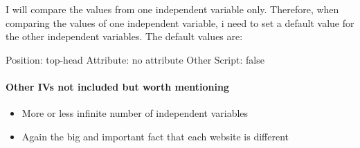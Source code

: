 I will compare the values from one independent variable only.
Therefore, when comparing the values of one independent variable, i need to set a default value for the other independent variables.
The default values are:

Position: top-head
Attribute: no attribute
Other Script: false






\paragraph{Other IVs not included but worth mentioning}

\begin{itemize}
\item More or less infinite number of independent variables
\item Again the big and important fact that each website is different
\end{itemize}









